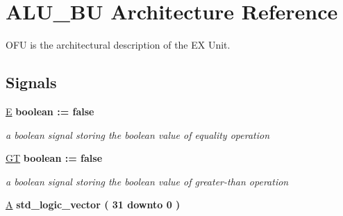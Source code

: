 \hypertarget{class_e_x_unit_1_1_a_l_u___b_u}{\section{A\-L\-U\-\_\-\-B\-U Architecture Reference}
\label{class_e_x_unit_1_1_a_l_u___b_u}
}


O\-F\-U is the architectural description of the E\-X Unit.  


\subsection*{Signals}
 \begin{DoxyCompactItemize}
\item 
\hypertarget{class_e_x_unit_1_1_a_l_u___b_u_abb079547a7e3a2edc783079e496ab230}{\hyperlink{class_e_x_unit_1_1_a_l_u___b_u_abb079547a7e3a2edc783079e496ab230}{E} {\bfseries \textcolor{comment}{boolean}\textcolor{vhdlchar}{ }\textcolor{vhdlchar}{ }\textcolor{vhdlchar}{\-:}\textcolor{vhdlchar}{=}\textcolor{vhdlchar}{ }\textcolor{vhdlchar}{false}\textcolor{vhdlchar}{ }} }\label{class_e_x_unit_1_1_a_l_u___b_u_abb079547a7e3a2edc783079e496ab230}

\begin{DoxyCompactList}\small\item\em a boolean signal storing the boolean value of equality operation \end{DoxyCompactList}\item 
\hypertarget{class_e_x_unit_1_1_a_l_u___b_u_a11b1a9c5106ad3b13e91ab299fe53ffc}{\hyperlink{class_e_x_unit_1_1_a_l_u___b_u_a11b1a9c5106ad3b13e91ab299fe53ffc}{G\-T} {\bfseries \textcolor{comment}{boolean}\textcolor{vhdlchar}{ }\textcolor{vhdlchar}{ }\textcolor{vhdlchar}{\-:}\textcolor{vhdlchar}{=}\textcolor{vhdlchar}{ }\textcolor{vhdlchar}{false}\textcolor{vhdlchar}{ }} }\label{class_e_x_unit_1_1_a_l_u___b_u_a11b1a9c5106ad3b13e91ab299fe53ffc}

\begin{DoxyCompactList}\small\item\em a boolean signal storing the boolean value of greater-\/than operation \end{DoxyCompactList}\item 
\hypertarget{class_e_x_unit_1_1_a_l_u___b_u_abd1839792ee9767d875129a826b25303}{\hyperlink{class_e_x_unit_1_1_a_l_u___b_u_abd1839792ee9767d875129a826b25303}{A} {\bfseries \textcolor{comment}{std\-\_\-logic\-\_\-vector}\textcolor{vhdlchar}{ }\textcolor{vhdlchar}{(}\textcolor{vhdlchar}{ } \textcolor{vhdldigit}{31} \textcolor{vhdlchar}{ }\textcolor{vhdlchar}{ }\textcolor{vhdlchar}{ }\textcolor{vhdlkeyword}{downto}\textcolor{vhdlchar}{ }\textcolor{vhdlchar}{ }\textcolor{vhdlchar}{ } \textcolor{vhdldigit}{0} \textcolor{vhdlchar}{ }\textcolor{vhdlchar}{)}\textcolor{vhdlchar}{ }} }\label{class_e_x_unit_1_1_a_l_u___b_u_abd1839792ee9767d875129a826b25303}


\end{DoxyCompactItemize}
